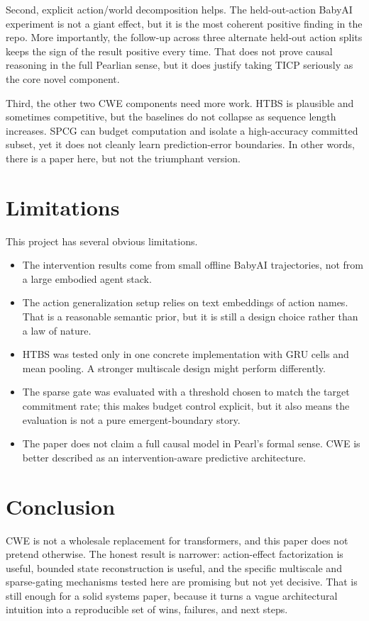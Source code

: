 \documentclass[11pt]{article}
\begin{document}
Second, explicit action/world decomposition helps. The held-out-action BabyAI experiment is not a giant effect, but it is the most coherent positive finding in the repo. More importantly, the follow-up across three alternate held-out action splits keeps the sign of the result positive every time. That does not prove causal reasoning in the full Pearlian sense, but it does justify taking TICP seriously as the core novel component.

Third, the other two CWE components need more work. HTBS is plausible and sometimes competitive, but the baselines do not collapse as sequence length increases. SPCG can budget computation and isolate a high-accuracy committed subset, yet it does not cleanly learn prediction-error boundaries. In other words, there is a paper here, but not the triumphant version.

\section{Limitations}
This project has several obvious limitations.
\begin{itemize}
    \item The intervention results come from small offline BabyAI trajectories, not from a large embodied agent stack.
    \item The action generalization setup relies on text embeddings of action names. That is a reasonable semantic prior, but it is still a design choice rather than a law of nature.
    \item HTBS was tested only in one concrete implementation with GRU cells and mean pooling. A stronger multiscale design might perform differently.
    \item The sparse gate was evaluated with a threshold chosen to match the target commitment rate; this makes budget control explicit, but it also means the evaluation is not a pure emergent-boundary story.
    \item The paper does not claim a full causal model in Pearl's formal sense. CWE is better described as an intervention-aware predictive architecture.
\end{itemize}

\section{Conclusion}
CWE is not a wholesale replacement for transformers, and this paper does not pretend otherwise. The honest result is narrower: action-effect factorization is useful, bounded state reconstruction is useful, and the specific multiscale and sparse-gating mechanisms tested here are promising but not yet decisive. That is still enough for a solid systems paper, because it turns a vague architectural intuition into a reproducible set of wins, failures, and next steps.



\end{document}
